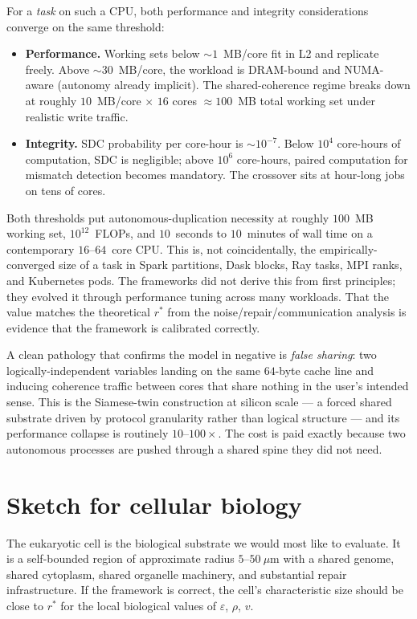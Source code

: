 \documentclass[11pt]{article}
\begin{document}
For a \emph{task} on such a CPU, both performance and integrity considerations converge on the same threshold:
\begin{itemize}[itemsep=2pt,topsep=2pt]
\item \textbf{Performance.} Working sets below $\sim 1$~MB/core fit in L2 and replicate freely. Above $\sim 30$~MB/core, the workload is DRAM-bound and NUMA-aware (autonomy already implicit). The shared-coherence regime breaks down at roughly $10$~MB/core $\times$ $16$ cores $\approx 100$~MB total working set under realistic write traffic.
\item \textbf{Integrity.} SDC probability per core-hour is $\sim 10^{-7}$. Below $10^{4}$ core-hours of computation, SDC is negligible; above $10^{6}$ core-hours, paired computation for mismatch detection becomes mandatory. The crossover sits at hour-long jobs on tens of cores.
\end{itemize}
Both thresholds put autonomous-duplication necessity at roughly $100$~MB working set, $10^{12}$~FLOPs, and $10$~seconds to $10$~minutes of wall time on a contemporary $16$--$64$~core CPU. This is, not coincidentally, the empirically-converged size of a task in Spark partitions, Dask blocks, Ray tasks, MPI ranks, and Kubernetes pods. The frameworks did not derive this from first principles; they evolved it through performance tuning across many workloads. That the value matches the theoretical $r^{\ast}$ from the noise/repair/communication analysis is evidence that the framework is calibrated correctly.

A clean pathology that confirms the model in negative is \emph{false sharing}: two logically-independent variables landing on the same $64$-byte cache line and inducing coherence traffic between cores that share nothing in the user's intended sense. This is the Siamese-twin construction at silicon scale --- a forced shared substrate driven by protocol granularity rather than logical structure --- and its performance collapse is routinely $10$--$100\times$. The cost is paid exactly because two autonomous processes are pushed through a shared spine they did not need.

\section{Sketch for cellular biology}

The eukaryotic cell is the biological substrate we would most like to evaluate. It is a self-bounded region of approximate radius $5$--$50~\mu$m with a shared genome, shared cytoplasm, shared organelle machinery, and substantial repair infrastructure. If the framework is correct, the cell's characteristic size should be close to $r^{\ast}$ for the local biological values of $\varepsilon$, $\rho$, $v$.
\end{document}
